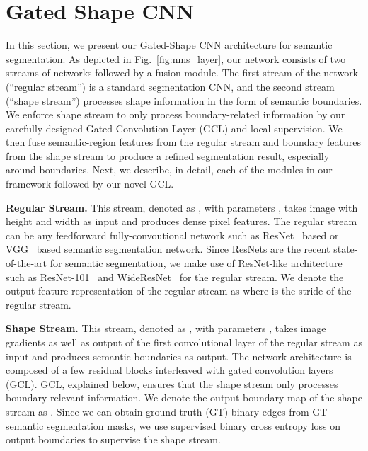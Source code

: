\documentclass[10pt,twocolumn,letterpaper]{article}
\begin{document}
\vspace{-1mm}
 

\section{Gated Shape CNN}
\label{sec:method}

In this section, we present our Gated-Shape CNN architecture for semantic segmentation. 
As depicted in Fig.~\ref{fig:nms_layer}, our network consists of two streams of networks followed by a fusion module. 
The first stream of the network (``regular stream'') is a standard segmentation CNN, and the second stream (``shape stream'') processes shape information in the form of semantic boundaries. 
We enforce shape stream to only process boundary-related information by our carefully designed Gated Convolution Layer (GCL) and local supervision.
We then fuse semantic-region features from the regular stream and boundary features from the shape stream to produce a refined segmentation result, especially around boundaries.
Next, we describe, in detail, each of the modules in 
our framework 
followed by our novel GCL.

\vspace{1mm}
\noindent \textbf{Regular Stream.} This stream,
denoted as , with parameters , takes image  with height  and width  as input and produces dense pixel features. The regular stream can be any feedforward fully-convoutional network such as ResNet~\cite{he15deepresidual} based or VGG~\cite{vggcnn} based semantic segmentation network. Since ResNets are the recent state-of-the-art for semantic segmentation, we make use of ResNet-like architecture such as ResNet-101~\cite{he15deepresidual} and WideResNet~\cite{zagoruyko2016wide} for the regular stream.
We denote the output feature representation of the regular stream as  where  is the stride of the regular stream.

\vspace{1mm}
\noindent \textbf{Shape Stream.} 
This stream,
denoted as , with parameters , takes image gradients  as well as output of the first convolutional layer of the regular stream as input and produces semantic boundaries as output.
The network architecture is composed of a few residual blocks interleaved with gated convolution layers (GCL). GCL, explained below, ensures that the shape stream only processes boundary-relevant information.
We denote the output boundary map of the shape stream as .
Since we can obtain ground-truth (GT) binary edges from GT semantic segmentation masks, we use supervised
binary cross entropy loss on output boundaries to supervise the shape stream.
\end{document}
